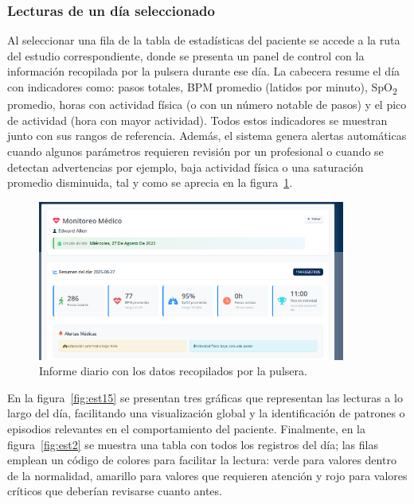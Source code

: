 \documentclass[12pt, a4paper]{article}
\begin{document}
\begin{umaappendices}
	\subsubsection{Lecturas de un día seleccionado}
	Al seleccionar una fila de la tabla de estadísticas del paciente se accede a la ruta del estudio correspondiente, donde se presenta un panel de control con la información recopilada por la pulsera durante ese día. La cabecera resume el día con indicadores como: pasos totales, BPM promedio (latidos por minuto), SpO\textsubscript{2} promedio, horas con actividad física (o con un número notable de pasos) y el pico de actividad (hora con mayor actividad). Todos estos indicadores se muestran junto con sus rangos de referencia. Además, el sistema genera alertas automáticas cuando algunos parámetros requieren revisión por un profesional o cuando se detectan advertencias por ejemplo, baja actividad física o una saturación promedio disminuida, tal y como se aprecia en la figura~\ref{fig:est1}.
	
	\begin{figure}[htbp]
		\centering
		\includegraphics[width=0.9\textwidth]{images/8_estudio1.png}
		\caption[Ejemplo]{Informe diario con los datos recopilados por la pulsera.}
		\label{fig:est1}
	\end{figure}
	
	En la figura~\ref{fig:est15} se presentan tres gráficas que representan las lecturas a lo largo del día, facilitando una visualización global y la identificación de patrones o episodios relevantes en el comportamiento del paciente. Finalmente, en la figura~\ref{fig:est2} se muestra una tabla con todos los registros del día; las filas emplean un código de colores para facilitar la lectura: verde para valores dentro de la normalidad, amarillo para valores que requieren atención y rojo para valores críticos que deberían revisarse cuanto antes.
	

\end{umaappendices}
\end{document}
